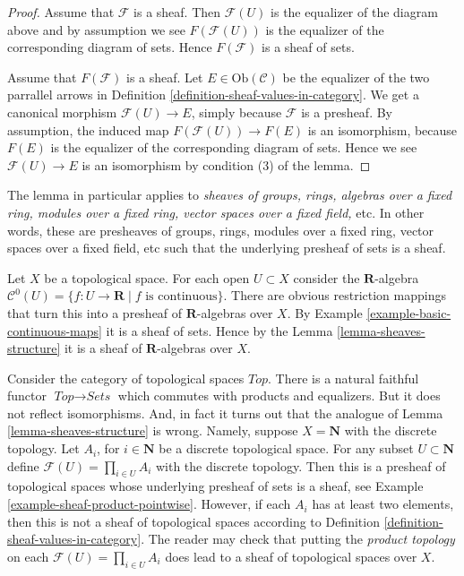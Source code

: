 \begin{proof}
Assume that $\mathcal{F}$ is a sheaf. Then
$\mathcal{F}(U)$ is the equalizer of the diagram
above and by assumption we see $F(\mathcal{F}(U))$
is the equalizer of the corresponding diagram
of sets. Hence $F(\mathcal{F})$ is a sheaf of sets.

\medskip\noindent
Assume that $F(\mathcal{F})$ is a sheaf.
Let $E \in \text{Ob}(\mathcal{C})$ be the
equalizer of the two parrallel arrows in 
Definition \ref{definition-sheaf-values-in-category}.
We get a canonical morphism $\mathcal{F}(U) \to E$,
simply because $\mathcal{F}$ is a presheaf.
By assumption, the induced map $F(\mathcal{F}(U)) \to F(E)$
is an isomorphism, because $F(E)$ is the equalizer
of the corresponding diagram of sets. Hence we
see $\mathcal{F}(U) \to E$ is an isomorphism
by condition (3) of the lemma.
\end{proof}

\noindent
The lemma in particular applies to
{\it sheaves of groups, rings, algebras over a fixed ring, modules
over a fixed ring, vector spaces over a fixed field,} etc.
In other words, these are presheaves of groups, rings,
modules over a fixed ring, vector spaces over a fixed field, etc
such that the underlying presheaf of sets is a sheaf.

\begin{example}
\label{example-C0-sheaf-rings}
Let $X$ be a topological space. For each open $U \subset X$ consider
the $\mathbf{R}$-algebra
$\mathcal{C}^{0}(U) = \{ f : U \to \mathbf{R} \mid f\text{ is continuous}\}$.
There are obvious restriction mappings that turn this into a
presheaf of $\mathbf{R}$-algebras over $X$.
By Example \ref{example-basic-continuous-maps} it is a sheaf of sets.
Hence by the Lemma \ref{lemma-sheaves-structure} it is a sheaf of
$\mathbf{R}$-algebras over $X$.
\end{example}

\begin{example}
\label{example-sheaves-topological-spaces}
Consider the category of topological spaces $\textit{Top}$.
There is a natural faithful functor $\textit{Top} \to \textit{Sets}$
which commutes with products and equalizers. But it does
not reflect isomorphisms. And, in fact it turns out that
the analogue of Lemma \ref{lemma-sheaves-structure} is wrong.
Namely, suppose $X = \mathbf{N}$ with the discrete
topology. Let $A_i$, for $i \in \mathbf{N}$ be a discrete
topological space. For any subset $U \subset \mathbf{N}$
define $\mathcal{F}(U) = \prod_{i\in U} A_i$ with the
discrete topology. Then this is a presheaf of topological
spaces whose underlying presheaf of sets is a sheaf, see
Example \ref{example-sheaf-product-pointwise}.
However, if each $A_i$ has at least two elements, then
this is not a sheaf of topological spaces
according to Definition \ref{definition-sheaf-values-in-category}.
The reader may check that putting the {\it product topology} on
each $\mathcal{F}(U) = \prod_{i\in U} A_i$ does lead to a sheaf
of topological spaces over $X$.
\end{example}


